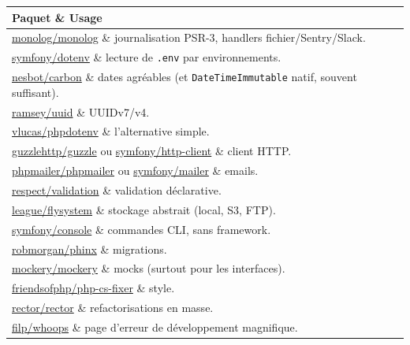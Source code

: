 \documentclass[12pt,a4paper,twoside,openright]{book}
\makeatletter
\newcommand{\fichier}[1]{\texttt{\color{pathgreen}#1}}
\newcommand{\link}[2]{\href{#2}{#1}}
\newenvironment{tabz}[1]{\rowcolors{2}{white}{tralight}%
  \small\setlength{\tabcolsep}{5pt}\setlength{\LTpre}{3pt}\setlength{\LTpost}{3pt}%
  \begin{longtable}{@{}#1@{}}\toprule}
  {\bottomrule\end{longtable}\normalfont\setlength{\tabcolsep}{6pt}}
\newcommand{\thd}[1]{\textbf{\color{white}#1}}
\newcommand{\headrow}{\rowcolor{theadbg}}
\makeatother
\begin{document}
\begin{tabz}{lX}
  \headrow \thd{Paquet} \& \thd{Usage} \\
  \midrule
  \link{monolog/monolog}{https://github.com/Seldaek/monolog} \& journalisation PSR-3, handlers fichier/Sentry/Slack.\\
  \link{symfony/dotenv}{https://symfony.com/components/Dotenv} \& lecture de \fichier{.env} par environnements.\\
  \link{nesbot/carbon}{https://carbon.nesbot.com/} \& dates agr\'eables (et \verb|DateTimeImmutable| natif, souvent suffisant).\\
  \link{ramsey/uuid}{https://github.com/ramsey/uuid} \& UUIDv7/v4.\\
  \link{vlucas/phpdotenv}{https://github.com/vlucas/phpdotenv} \& l'alternative simple.\\
  \link{guzzlehttp/guzzle}{https://docs.guzzlephp.org/} ou \link{symfony/http-client}{https://symfony.com/components/HttpClient} \& client HTTP.\\
  \link{phpmailer/phpmailer}{https://github.com/PHPMailer/PHPMailer} ou \link{symfony/mailer}{https://symfony.com/doc/current/mailer.html} \& emails.\\
  \link{respect/validation}{https://respectvalidation.readthedocs.io/} \& validation d\'eclarative.\\
  \link{league/flysystem}{https://flysystem.thephpleague.com/} \& stockage abstrait (local, S3, FTP).\\
  \link{symfony/console}{https://symfony.com/components/Console} \& commandes CLI, sans framework.\\
  \link{robmorgan/phinx}{https://book.cakephp.org/phinx/} \& migrations.\\
  \link{mockery/mockery}{https://docs.mockery.io/} \& mocks (surtout pour les interfaces).\\
  \link{friendsofphp/php-cs-fixer}{https://github.com/PHP-CS-Fixer/PHP-CS-Fixer} \& style.\\
  \link{rector/rector}{https://getrector.com/} \& refactorisations en masse.\\
  \link{filp/whoops}{https://github.com/filp/whoops} \& page d'erreur de d\'eveloppement magnifique.\\
\end{tabz}
\end{document}
